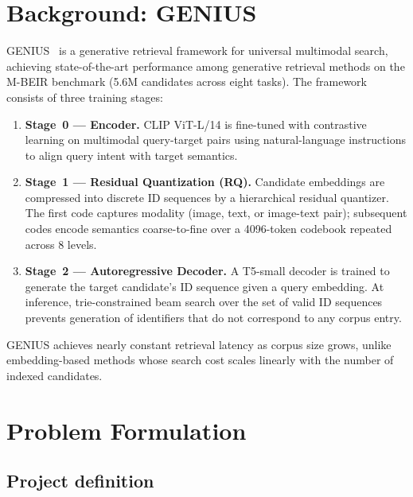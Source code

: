 \documentclass[11pt,a4paper]{article}
\begin{document}
\section{Background: GENIUS}

GENIUS~\cite{genius2025} is a generative retrieval framework for universal
multimodal search, achieving state-of-the-art performance among generative
retrieval methods on the M-BEIR benchmark (5.6M candidates across eight tasks).
The framework consists of three training stages:

\begin{enumerate}[itemsep=2pt]
    \item \textbf{Stage~0 --- Encoder.}
    CLIP ViT-L/14 is fine-tuned with contrastive learning on multimodal
    query-target pairs using natural-language instructions to align query
    intent with target semantics.

    \item \textbf{Stage~1 --- Residual Quantization (RQ).}
    Candidate embeddings are compressed into discrete ID sequences by a
    hierarchical residual quantizer.
    The first code captures modality (image, text, or image-text pair);
    subsequent codes encode semantics coarse-to-fine over a 4096-token
    codebook repeated across 8 levels.

    \item \textbf{Stage~2 --- Autoregressive Decoder.}
    A T5-small decoder is trained to generate the target candidate's ID
    sequence given a query embedding.
    At inference, trie-constrained beam search over the set of valid ID
    sequences prevents generation of identifiers that do not correspond to
    any corpus entry.
\end{enumerate}

GENIUS achieves nearly constant retrieval latency as corpus size grows,
unlike embedding-based methods whose search cost scales linearly with the
number of indexed candidates.

\section{Problem Formulation}

\subsection{Project definition}
\end{document}
